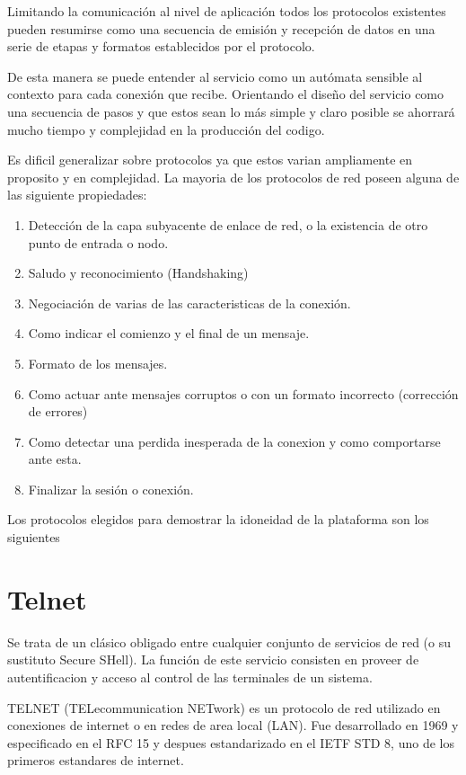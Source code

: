 \documentclass[a4paper,spanish,12pt]{book}
\begin{document}
Limitando la comunicación al nivel de aplicación todos los protocolos existentes pueden resumirse como una secuencia de emisión y recepción de datos en una serie de etapas y formatos establecidos por el protocolo. 

De esta manera se puede entender al servicio como un autómata sensible al contexto para cada conexión que recibe. Orientando el diseño del servicio como una secuencia de pasos y que estos sean lo más simple y claro posible se ahorrará mucho tiempo y complejidad en la producción del codigo. 

Es dificil generalizar sobre protocolos ya que estos varian ampliamente en proposito y en complejidad. La mayoria de los protocolos de red poseen alguna de las siguiente propiedades:

\begin{enumerate}
\item Detección de la capa subyacente de enlace de red, o la existencia de otro punto de entrada o nodo.
\item Saludo y reconocimiento (Handshaking)
\item Negociación de varias de las caracteristicas de la conexión.
\item Como indicar el comienzo y el final de un mensaje.
\item Formato de los mensajes.
\item Como actuar ante mensajes corruptos o con un formato incorrecto (corrección de errores)
\item Como detectar una perdida inesperada de la conexion y como comportarse ante esta.
\item Finalizar la sesión o conexión.
\end{enumerate}

Los protocolos elegidos para demostrar la idoneidad de la plataforma son los siguientes


\section{Telnet}
Se trata de un cl\'asico obligado entre cualquier conjunto de servicios de red (o su sustituto Secure SHell). La función de este servicio consisten en proveer de autentificacion y acceso al control de las terminales de un sistema.

TELNET (TELecommunication NETwork) es un protocolo de red utilizado en conexiones de internet o en redes de area local (LAN). Fue desarrollado en 1969 y especificado en el RFC 15 y despues estandarizado en el IETF STD 8, uno de los primeros estandares de internet.
\end{document}
